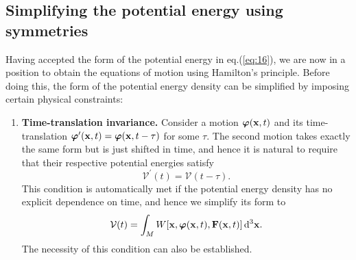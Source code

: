\documentclass[a4paper,12pt]{paper}
\providecommand{\DIFadd}[1]{{\protect\color{blue}\uwave{#1}}} %
\providecommand{\DIFaddbegin}{} %
\providecommand{\DIFaddend}{} %
\begin{document}
\subsection*{Simplifying the potential energy using symmetries}
Having accepted the form of the potential energy in eq.\DIFaddbegin \DIFadd{~}\DIFaddend (\ref{eq:16}), we are now in a position to obtain the equations of 
motion using Hamilton's principle. Before doing this, the form of the potential energy density can 
be simplified by imposing certain physical constraints:

\begin{enumerate}
    \item[(i)] \textbf{Time-translation invariance.} Consider a motion $\bm{\varphi}(\mathbf{x},t)$ and its time-translation 
    $\bm{\varphi}^{\prime}(\mathbf{x},t)=\bm{\varphi}(\mathbf{x},t-\tau)$ for some $\tau$. The second motion takes 
    exactly the same form but is just shifted in time, and hence it is natural to require that their respective 
    potential energies satisfy
    \begin{equation}
    \mathcal{V}^{\prime}(t)=\mathcal{V}(t-\tau).
    \label{eq:17}
    \end{equation}
    This condition is automatically met if the potential energy density has no explicit dependence on time, and hence we simplify its form to
    \begin{equation}
    \mathcal{V}(t)=\int_{M}W[\mathbf{x},\bm{\varphi}(\mathbf{x},t),\mathbf{F}(\mathbf{x},t)]\,\mathrm{d}^{3}\mathbf{x}.
    \label{eq:18}
    \end{equation}
    The necessity of this condition can also be established.


\end{enumerate}
\end{document}

